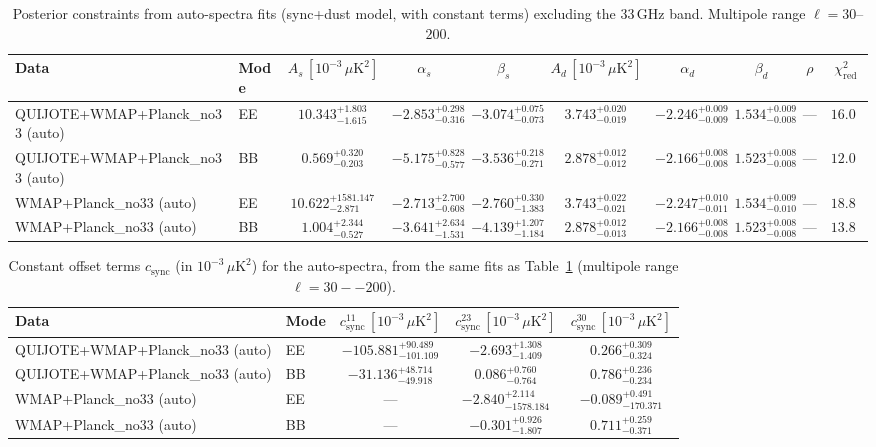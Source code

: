 \begin{table}[h]
\centering
\scriptsize
\setlength{\tabcolsep}{4pt}
\caption{Posterior constraints from auto-spectra fits (sync+dust model, with constant terms) excluding the 33\,GHz band. Multipole range $\ell=30$--$200$.}
\label{tab:fit_results_auto_no33_sync_dust}
\begin{tabular}{llcccccccc}
\toprule
Data & Mode & $A_s\,[10^{-3}\,\mu\mathrm{K}^2]$ & $\alpha_s$ & $\beta_s$ & $A_d\,[10^{-3}\,\mu\mathrm{K}^2]$ & $\alpha_d$ & $\beta_d$ & $\rho$ & $\chi^2_\mathrm{red}$ \\
\midrule
QUIJOTE+WMAP+Planck\_no33 (auto) & EE & $10.343^{+1.803}_{-1.615}$ & $-2.853^{+0.298}_{-0.316}$ & $-3.074^{+0.075}_{-0.073}$ & $3.743^{+0.020}_{-0.019}$ & $-2.246^{+0.009}_{-0.009}$ & $1.534^{+0.009}_{-0.008}$ & --- & $16.09$ \\
QUIJOTE+WMAP+Planck\_no33 (auto) & BB & $0.569^{+0.320}_{-0.203}$ & $-5.175^{+0.828}_{-0.577}$ & $-3.536^{+0.218}_{-0.271}$ & $2.878^{+0.012}_{-0.012}$ & $-2.166^{+0.008}_{-0.008}$ & $1.523^{+0.008}_{-0.008}$ & --- & $12.00$ \\
WMAP+Planck\_no33 (auto) & EE & $10.622^{+1581.147}_{-2.871}$ & $-2.713^{+2.700}_{-0.608}$ & $-2.760^{+0.330}_{-1.383}$ & $3.743^{+0.022}_{-0.021}$ & $-2.247^{+0.010}_{-0.011}$ & $1.534^{+0.009}_{-0.010}$ & --- & $18.81$ \\
WMAP+Planck\_no33 (auto) & BB & $1.004^{+2.344}_{-0.527}$ & $-3.641^{+2.634}_{-1.531}$ & $-4.139^{+1.207}_{-1.184}$ & $2.878^{+0.012}_{-0.013}$ & $-2.166^{+0.008}_{-0.008}$ & $1.523^{+0.008}_{-0.008}$ & --- & $13.84$ \\
\bottomrule
\end{tabular}
\end{table}

\begin{table}[h]
\centering
\scriptsize
\setlength{\tabcolsep}{4pt}
\caption{Constant offset terms $c_{\mathrm{sync}}$ (in $10^{-3}\,\mu\mathrm{K}^2$) for the auto-spectra, from the same fits as Table~\ref{tab:fit_results_auto_no33_sync_dust} (multipole range $\ell=30--200$).}
\label{tab:fit_results_auto_no33_sync_dust_c_terms}
\begin{tabular}{llccc}
\toprule
Data & Mode & $c_{\mathrm{sync}}^{11}\,[10^{-3}\,\mu\mathrm{K}^2]$ & $c_{\mathrm{sync}}^{23}\,[10^{-3}\,\mu\mathrm{K}^2]$ & $c_{\mathrm{sync}}^{30}\,[10^{-3}\,\mu\mathrm{K}^2]$ \\
\midrule
QUIJOTE+WMAP+Planck\_no33 (auto) & EE & $-105.881^{+90.489}_{-101.109}$ & $-2.693^{+1.308}_{-1.409}$ & $0.266^{+0.309}_{-0.324}$ \\
QUIJOTE+WMAP+Planck\_no33 (auto) & BB & $-31.136^{+48.714}_{-49.918}$ & $0.086^{+0.760}_{-0.764}$ & $0.786^{+0.236}_{-0.234}$ \\
WMAP+Planck\_no33 (auto) & EE & --- & $-2.840^{+2.114}_{-1578.184}$ & $-0.089^{+0.491}_{-170.371}$ \\
WMAP+Planck\_no33 (auto) & BB & --- & $-0.301^{+0.926}_{-1.807}$ & $0.711^{+0.259}_{-0.371}$ \\
\bottomrule
\end{tabular}
\end{table}
